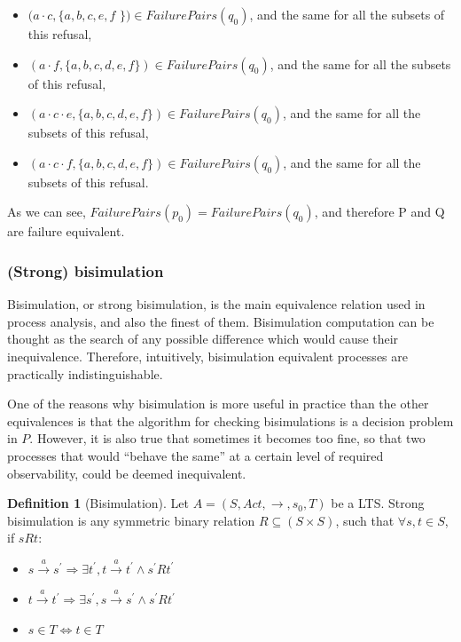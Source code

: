 \documentclass[11pt]{article}
\newcommand{\cmark}{\ding{51}}
\theoremstyle{definition}
\newtheorem{definition}{Definition}
\theoremstyle{plain}
\begin{document}
\begin{itemize}
\begin{itemize}
		\item $(a\cdot c, \{a, b, c, e, f$ \cmark $\}) \in FailurePairs(q_0)$, and the same for all the subsets of this refusal,
		\item $(a\cdot f, \{a, b, c, d, e, f\}) \in FailurePairs(q_0)$, and the same for all the subsets of this refusal,
		\item $(a\cdot c\cdot e, \{a, b, c, d, e, f\}) \in FailurePairs(q_0)$, and the same for all the subsets of this refusal,
		\item $(a\cdot c\cdot f, \{a, b, c, d, e, f\}) \in FailurePairs(q_0)$, and the same for all the subsets of this refusal.
	\end{itemize}
\end{itemize}

As we can see, $ FailurePairs(p_0) = FailurePairs(q_0) $, and therefore P and Q are failure equivalent.

\subsubsection{(Strong) bisimulation}

Bisimulation, or strong bisimulation, is the main equivalence relation used in process analysis, and also the finest of them. Bisimulation computation can be thought as the search of any possible difference which would cause their inequivalence. Therefore, intuitively, bisimulation equivalent processes are practically indistinguishable.

One of the reasons why bisimulation is more useful in practice than the other equivalences is that the algorithm for checking bisimulations is a decision problem in $ P $. However, it is also true that sometimes it becomes too fine, so that two processes that would ``behave the same'' at a certain level of required observability, could be deemed inequivalent.

\begin{definition} [Bisimulation]
	Let $ A = (S, Act, \rightarrow, s_0, T) $ be a LTS. Strong bisimulation is any symmetric binary relation $ R  \subseteq (S\times S) $, such that $ \forall s, t \in S$, if $s R t $:
	\begin{itemize}
		\item $ s\xrightarrow{a}s^\prime  \Rightarrow \exists t^\prime , t\xrightarrow{a}t^\prime  \wedge s^\prime  R t^\prime  $
		\item $ t\xrightarrow{a}t^\prime  \Rightarrow \exists s^\prime , s\xrightarrow{a}s^\prime  \wedge s^\prime  R t^\prime  $
		\item $ s \in T \iff t \in T $
	\end{itemize}
	
\end{definition}
\end{document}
